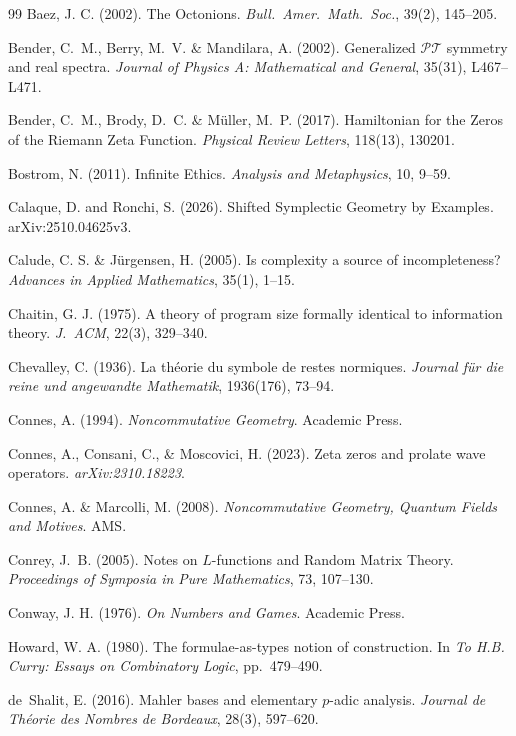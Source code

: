 \begin{thebibliography}{99}
Baez, J. C. (2002). The Octonions. \emph{Bull.\ Amer.\ Math.\ Soc.}, 39(2), 145--205.

Bender, C.~M., Berry, M.~V. \& Mandilara, A. (2002).
Generalized $\mathcal{PT}$ symmetry and real spectra.
\emph{Journal of Physics A: Mathematical and General}, 35(31), L467--L471.

Bender, C.~M., Brody, D.~C. \& M\"uller, M.~P. (2017).
Hamiltonian for the Zeros of the Riemann Zeta Function.
\emph{Physical Review Letters}, 118(13), 130201.

Bostrom, N. (2011). Infinite Ethics. \emph{Analysis and Metaphysics}, 10, 9--59.

Calaque, D. and Ronchi, S. (2026). Shifted Symplectic Geometry by Examples. arXiv:2510.04625v3.

Calude, C. S. \& J\"urgensen, H. (2005). Is complexity a source of incompleteness? \emph{Advances in Applied Mathematics}, 35(1), 1--15.

Chaitin, G. J. (1975). A theory of program size formally identical to information theory. \emph{J.\ ACM}, 22(3), 329--340.

Chevalley, C. (1936). La th\'eorie du symbole de restes normiques. \emph{Journal f\"ur die reine und angewandte Mathematik}, 1936(176), 73--94.

Connes, A. (1994). \emph{Noncommutative Geometry}. Academic Press.

Connes, A., Consani, C., \& Moscovici, H. (2023). Zeta zeros and prolate wave operators. \emph{arXiv:2310.18223}.

Connes, A. \& Marcolli, M. (2008). \emph{Noncommutative Geometry, Quantum Fields and Motives}. AMS.

Conrey, J.~B. (2005).
Notes on $L$-functions and Random Matrix Theory.
\emph{Proceedings of Symposia in Pure Mathematics}, 73, 107--130.

Conway, J. H. (1976). \emph{On Numbers and Games}. Academic Press.

Howard, W. A. (1980). The formulae-as-types notion of construction. In \emph{To H.B. Curry: Essays on Combinatory Logic}, pp.~479--490.

de~Shalit, E. (2016).
Mahler bases and elementary $p$-adic analysis.
\textit{Journal de Th\'eorie des Nombres de Bordeaux}, 28(3), 597--620.


\end{thebibliography}
